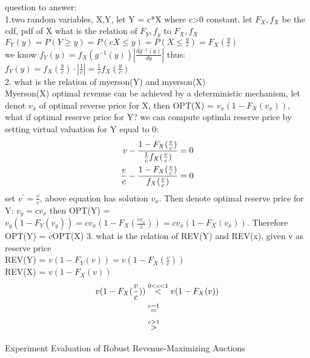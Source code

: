 question to answer:\\
1.two random variables, X,Y, let Y = c*X where c>0 constant. let $F_X,f_X$ be the cdf, pdf of X what is the relation of $F_Y,f_y$ to $F_X,f_X$\\
$F_Y (y) = P(Y \geqslant y) = P(cX \leqslant y) = P(X \leqslant \frac{y}{c}) = F_X (\frac{y}{c})$\\
we know $f_Y(y) = f_X (g^{-1}(y))|\frac{d g^{-1}(y)}{dy}|$ thus:\\
$f_Y (y) = f_X(\frac{y}{c})\cdot|\frac{1}{c}| =\frac{1}{c}f_X(\frac{y}{c})$\\
2. what is the relation of myerson(Y) and myerson(X)\\
Myerson(X) optimal revenue can be achieved by a deterministic mechanism, let denot $v_x$ of optimal reverse price for X, then OPT(X) = $v_x(1-F_X(v_x))$, what if optimal reserve price for Y?
we can compute optimla reserve price by setting virtual valuation for Y equal to 0:
\begin{align}\notag
v - \frac{1-F_X (\frac{v}{c})}{\frac{1}{c}f_X(\frac{v}{c}) } &= 0 \\     
\notag  \frac{v}{c} - \frac{1-F_X (\frac{v}{c})}{ f_X(\frac{v}{c}) }  &= 0
\end{align}
set $v^{'} = \frac{v}{c}$, above equation has solution $v_x$.
Then denote optimal reserve price for Y: $v_y =c v_x$ then OPT(Y) = $v_y(1 - F_Y(v_y)) =cv_x(1 - F_X(\frac{cv_x}{c})) = cv_x(1 - F_X(v_x))$. Therefore OPT(Y) = cOPT(X)
3. what is the relation of REV(Y) and REV(x), given v as reserve price\\
REV(Y) = $v(1-F_Y(v)) = v(1-F_X(\frac{v}{c}))$\\
REV(X) =  $v(1-F_X(v))$ 
\begin{equation}\notag
\begin{split}	
v(1-F_X(\frac{v}{c})) &\overset{0 < c < 1}{ < }v(1-F_X(v))\\&\overset{c= 1}{ = } \\&\overset{c > 1}{ > }
\end{split}
\end{equation} 




Experiment Evaluation of Robust Revenue-Maximizing Auctions\\ \\











